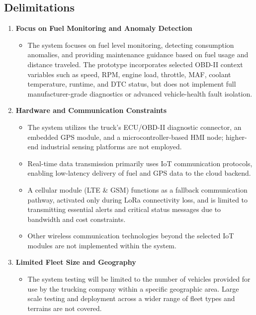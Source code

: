 \subsection{Delimitations}
\begin{enumerate}
	\item \textbf{Focus on Fuel Monitoring and Anomaly Detection}
		\begin{itemize}
			\item The system focuses on fuel level monitoring, detecting consumption anomalies, and providing maintenance guidance based on fuel usage and distance traveled. The prototype incorporates selected OBD-II context variables such as speed, RPM, engine load, throttle, MAF, coolant temperature, runtime, and DTC status, but does not implement full manufacturer-grade diagnostics or advanced vehicle-health fault isolation.
		\end{itemize}

    \item \textbf{Hardware and Communication Constraints}
        \begin{itemize}
            \item The system utilizes the truck's ECU/OBD-II diagnostic connector, an embedded GPS module, and a microcontroller-based HMI node; higher-end industrial sensing platforms are not employed.
            \item Real-time data transmission primarily uses IoT communication protocols, enabling low-latency delivery of fuel and GPS data to the cloud backend.
            \item A cellular module (LTE \& GSM) functions as a fallback communication pathway, activated only during LoRa connectivity loss, and is limited to transmitting essential alerts and critical status messages due to bandwidth and cost constraints.
            \item Other wireless communication technologies beyond the selected IoT modules are not implemented within the system.
        \end{itemize}


	\item \textbf{Limited Fleet Size and Geography}
		\begin{itemize}
			\item The system testing will be limited to the number of vehicles provided for use by the trucking company within a specific geographic area. Large scale testing and deployment across a wider range of fleet types and terrains are not covered.
        \end{itemize}


\end{enumerate}
